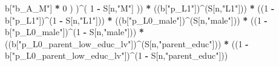 \documentclass[
]{book}
\newenvironment{Shaded}{\begin{snugshade}}{\end{snugshade}}
\newcommand{\DecValTok}[1]{\textcolor[rgb]{0.00,0.00,0.81}{#1}}
\newcommand{\NormalTok}[1]{#1}
\newcommand{\SpecialCharTok}[1]{\textcolor[rgb]{0.81,0.36,0.00}{\textbf{#1}}}
\newcommand{\StringTok}[1]{\textcolor[rgb]{0.31,0.60,0.02}{#1}}
\begin{document}
\begin{Shaded}
\begin{Highlighting}[]
\NormalTok{                b[}\StringTok{"b\_A\_M"}\NormalTok{] }\SpecialCharTok{*} \DecValTok{0}\NormalTok{ ) )}\SpecialCharTok{\^{}}\NormalTok{( }\DecValTok{1} \SpecialCharTok{{-}}\NormalTok{ S[n,}\StringTok{"M"}\NormalTok{] )) }\SpecialCharTok{*}
\NormalTok{      ((b[}\StringTok{"p\_L1"}\NormalTok{])}\SpecialCharTok{\^{}}\NormalTok{(S[n,}\StringTok{"L1"}\NormalTok{])) }\SpecialCharTok{*}
\NormalTok{      ((}\DecValTok{1} \SpecialCharTok{{-}}\NormalTok{ b[}\StringTok{"p\_L1"}\NormalTok{])}\SpecialCharTok{\^{}}\NormalTok{(}\DecValTok{1} \SpecialCharTok{{-}}\NormalTok{ S[n,}\StringTok{"L1"}\NormalTok{])) }\SpecialCharTok{*}
\NormalTok{      ((b[}\StringTok{"p\_L0\_male"}\NormalTok{])}\SpecialCharTok{\^{}}\NormalTok{(S[n,}\StringTok{"male"}\NormalTok{])) }\SpecialCharTok{*} 
\NormalTok{      ((}\DecValTok{1} \SpecialCharTok{{-}}\NormalTok{ b[}\StringTok{"p\_L0\_male"}\NormalTok{])}\SpecialCharTok{\^{}}\NormalTok{(}\DecValTok{1} \SpecialCharTok{{-}}\NormalTok{ S[n,}\StringTok{"male"}\NormalTok{])) }\SpecialCharTok{*} 
\NormalTok{      ((b[}\StringTok{"p\_L0\_parent\_low\_educ\_lv"}\NormalTok{])}\SpecialCharTok{\^{}}\NormalTok{(S[n,}\StringTok{"parent\_educ"}\NormalTok{])) }\SpecialCharTok{*}
\NormalTok{      ((}\DecValTok{1} \SpecialCharTok{{-}}\NormalTok{ b[}\StringTok{"p\_L0\_parent\_low\_educ\_lv"}\NormalTok{])}\SpecialCharTok{\^{}}\NormalTok{(}\DecValTok{1} \SpecialCharTok{{-}}\NormalTok{ S[n,}\StringTok{"parent\_educ"}\NormalTok{])) }
    

\end{Highlighting}
\end{Shaded}
\end{document}
